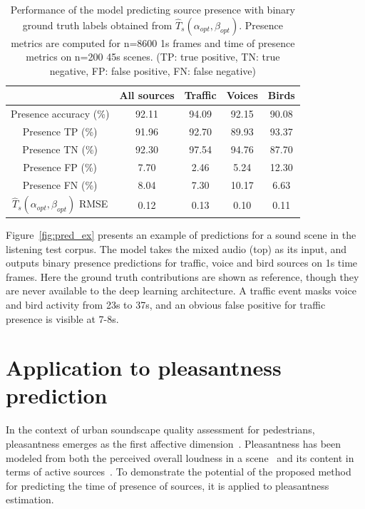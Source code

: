 \documentclass[twocolumn]{article}
\begin{document}
\begin{table}[h!]
\centering
\caption{Performance of the model predicting source presence with binary ground truth labels obtained from $\hat T_s(\alpha_{opt}, \beta_{opt})$. Presence metrics are computed for n=8600 1s frames and time of presence metrics on n=200 45s scenes. (TP: true positive, TN: true negative, FP: false positive, FN: false negative)}
\label{tab:perf_cmp}
\begin{tabular}{ c | c | c c c }
\hline
	 & All sources & Traffic & Voices & Birds \\ \hline
	Presence accuracy (\%) &  92.11 & 94.09 & 92.15 & 90.08 \\
	Presence TP (\%) & 91.96 & 92.70 & 89.93 & 93.37 \\
	Presence TN (\%) & 92.30 & 97.54 & 94.76 & 87.70 \\
	Presence FP (\%) & 7.70 & 2.46 & 5.24 & 12.30 \\
	Presence FN (\%) & 8.04 & 7.30 & 10.17 & 6.63 \\ \hline
	$\hat T_s(\alpha_{opt}, \beta_{opt})$ RMSE & 0.12 & 0.13 & 0.10 & 0.11 \\
\end{tabular}
\end{table}

Figure~\ref{fig:pred_ex} presents an example of predictions for a sound scene in the listening test corpus. The model takes the mixed audio (top) as its input, and outputs binary presence predictions for traffic, voice and bird sources on 1s time frames. Here the ground truth contributions are shown as reference, though they are never available to the deep learning architecture. A traffic event masks voice and bird activity from 23s to 37s, and an obvious false positive for traffic presence is visible at 7-8s.



\section{Application to pleasantness prediction}
\label{sec:app}

In the context of urban soundscape quality assessment for pedestrians, pleasantness emerges as the first affective dimension~\cite{axelsson2010}. Pleasantness has been modeled from both the perceived overall loudness in a scene~\cite{blauert1997, jekosch2004} and its content in terms of active sources~\cite{axelsson2010, lavandier2006, ricciardi2014, aumond2017}. To demonstrate the potential of the proposed method for predicting the time of presence of sources, it is applied to pleasantness estimation.
\end{document}
